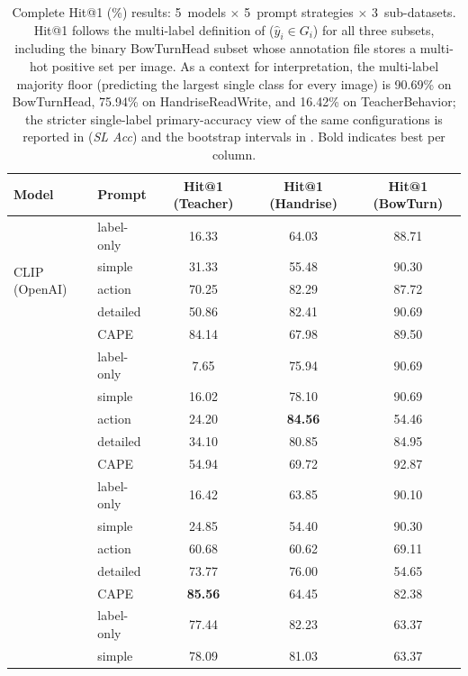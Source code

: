 \documentclass[symmetry,article,submit,pdftex,moreauthors]{Definitions/mdpi}
\begin{document}
\begin{table}[H]
\caption{Complete Hit@1 (\%) results: 5~models $\times$ 5~prompt strategies $\times$ 3~sub-datasets. Hit@1 follows the multi-label definition of  ($\hat{y}_i \in G_i$) for all three subsets, including the binary BowTurnHead subset whose annotation file stores a multi-hot positive set per image. As a context for interpretation, the multi-label majority floor (predicting the largest single class for every image) is 90.69\% on BowTurnHead, 75.94\% on HandriseReadWrite, and 16.42\% on TeacherBehavior; the stricter single-label primary-accuracy view of the same configurations is reported in  (\textit{SL Acc}) and the bootstrap intervals in . Bold indicates best per column.}
\label{tab:main_results}
\centering
\small
\setlength{\tabcolsep}{4pt}
\begin{tabular}{ll ccc}
\toprule
\textbf{Model} & \textbf{Prompt} & \textbf{Hit@1 (Teacher)} & \textbf{Hit@1 (Handrise)} & \textbf{Hit@1 (BowTurn)} \\
\midrule
\multirow{5}{*}{CLIP (OpenAI)}
 & label-only & 16.33 & 64.03 & 88.71 \\
 & simple & 31.33 & 55.48 & 90.30 \\
 & action & 70.25 & 82.29 & 87.72 \\
 & detailed & 50.86 & 82.41 & 90.69 \\
 & CAPE & 84.14 & 67.98 & 89.50 \\
\addlinespace
\multirow{5}{*}{OpenCLIP (LAION)}
 & label-only & 7.65 & 75.94 & 90.69 \\
 & simple & 16.02 & 78.10 & 90.69 \\
 & action & 24.20 & \textbf{84.56} & 54.46\rlap{$^{\ddagger}$} \\
 & detailed & 34.10 & 80.85 & 84.95 \\
 & CAPE & 54.94 & 69.72 & 92.87 \\
\addlinespace
\multirow{5}{*}{SigLIP2}
 & label-only & 16.42\rlap{$^{\S}$} & 63.85 & 90.10 \\
 & simple & 24.85 & 54.40 & 90.30 \\
 & action & 60.68 & 60.62 & 69.11 \\
 & detailed & 73.77 & 76.00 & 54.65 \\
 & CAPE & \textbf{85.56} & 64.45 & 82.38 \\
\addlinespace
\multirow{5}{*}{EVA02-CLIP}
 & label-only & 77.44 & 82.23 & 63.37 \\
 & simple & 78.09 & 81.03 & 63.37 \\

\end{tabular}
\end{table}
\end{document}
